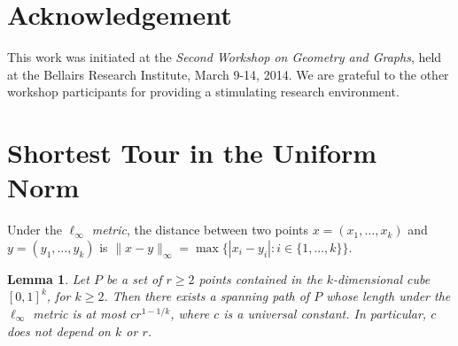 \documentclass[11pt]{patmorin}
\newtheorem{lemma}[theorem]{Lemma}
\begin{document}
\section*{Acknowledgement}

This work was initiated at the \emph{Second Workshop on Geometry and Graphs},
held at the Bellairs Research Institute, March 9-14, 2014.  We are
grateful to the other workshop participants for providing a stimulating
research environment.






\appendix
\newpage
\section{Shortest Tour in the Uniform Norm}
\label{app:uniform-norm}

Under the \emph{$\ell_\infty$ metric}, the distance between two points $x=(x_1,\ldots,x_k)$ and $y=(y_1,\ldots,y_k)$ is $\|x-y\|_\infty = \max\{|x_i-y_i|:i\in\{1,\ldots,k\}\}$.  

\begin{lemma}\label{lemma:tsp}
  Let $P$ be a set of $r\ge 2$ points contained in the $k$-dimensional
  cube $[0,1]^k$, for $k\ge 2$.  Then there exists a spanning path of $P$
  whose length under the $\ell_\infty$ metric is at most $cr^{1-1/k}$,
  where $c$ is a universal constant. In particular, $c$ does not depend
  on $k$ or $r$.
\end{lemma}
\end{document}
